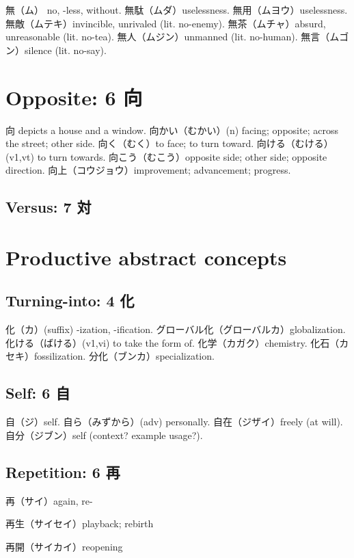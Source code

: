 無（ム） no, -less, without.
無駄（ムダ）uselessness.
無用（ムヨウ）uselessness.
無敵（ムテキ）invincible, unrivaled (lit. no-enemy).
無茶（ムチャ）absurd, unreasonable (lit. no-tea).
無人（ムジン）unmanned (lit. no-human).
無言（ムゴン）silence (lit. no-say).

\section{Opposite: 6 向}

向 depicts a house and a window.
向かい（むかい）(n) facing; opposite; across the street; other side.
向く（むく）to face; to turn toward.
向ける（むける）(v1,vt) to turn towards.
向こう（むこう）opposite side; other side; opposite direction.
向上（コウジョウ）improvement; advancement; progress.

\subsection{Versus: 7 対}

\section{Productive abstract concepts}

\subsection{Turning-into: 4 化}

化（カ）(suffix) -ization, -ification.
グローバル化（グローバルカ）globalization.
化ける（ばける）(v1,vi) to take the form of.
化学（カガク）chemistry.
化石（カセキ）fossilization.
分化（ブンカ）specialization.

\subsection{Self: 6 自}

自（ジ）self.
自ら（みずから）(adv) personally.
自在（ジザイ）freely (at will).
自分（ジブン）self (context? example usage?).

\subsection{Repetition: 6 再}

再（サイ）again, re-

再生（サイセイ）playback; rebirth

再開（サイカイ）reopening

